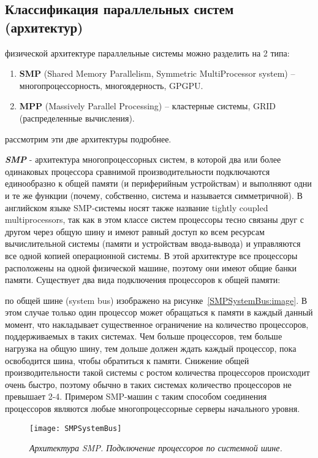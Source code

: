 { %
	\subsection{Классификация параллельных систем (архитектур)}
	\Large{} физической архитектуре параллельные системы можно разделить на 2 типа:
		\begin{enumerate}
			\item\textbf{SMP} (Shared Memory Parallelism, Symmetric MultiProcessor system) – многопроцессорность, многоядерность, GPGPU. 
			\item\textbf{MPP} (Massively Parallel Processing) – кластерные системы, GRID (распределенные вычисления).
		\end{enumerate}
	 рассмотрим эти две архитектуры подробнее.
	\par\textbf{\textit{SMP}}  - архитектура многопроцессорных систем, в которой два или более одинаковых процессора сравнимой производительности подключаются единообразно к общей памяти (и периферийным устройствам) и выполняют одни и те же функции (почему, собственно, система и называется симметричной). В английском языке SMP-системы носят также название tightly coupled multiprocessors, так как в этом классе систем процессоры тесно связаны друг с другом через общую шину и имеют равный доступ ко всем ресурсам вычислительной системы (памяти и устройствам ввода-вывода) и управляются все одной копией операционной системы. В этой архитектуре все процессоры расположены на одной физической машине, поэтому они имеют общие банки памяти. Существует два вида подключения процессоров к общей памяти:
		\begin{itemize}
			 по общей шине (system bus) изображено на рисунке~\ref{SMPSystemBus:image}. В этом случае только один процессор может обращаться к памяти в каждый данный момент, что накладывает существенное ограничение на количество процессоров, поддерживаемых в таких системах. Чем больше процессоров, тем больше нагрузка на общую шину, тем дольше должен ждать каждый процессор, пока освободится шина, чтобы обратиться к памяти. Снижение общей производительности такой системы с ростом количества процессоров происходит очень быстро, поэтому обычно в таких системах количество процессоров не превышает 2-4. Примером SMP-машин с таким способом соединения процессоров являются любые многопроцессорные серверы начального уровня.
				\begin{figure}[H]
					\texttt{[image: SMPSystemBus]}
					\caption{\textit{Архитектура SMP. Подключение процессоров по системной шине.}}

\end{figure}
\end{itemize}}
